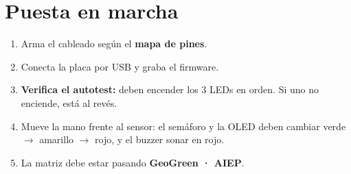 \documentclass[10pt,letterpaper]{article}
\begin{document}
\section{Puesta en marcha}
\begin{enumerate}
\item Arma el cableado según el \textbf{mapa de pines}.
\item Conecta la placa por USB y graba el firmware.
\item \textbf{Verifica el autotest:} deben encender los 3 LEDs en orden. Si uno no enciende, está
al revés.
\item Mueve la mano frente al sensor: el semáforo y la OLED deben cambiar
verde $\rightarrow$ amarillo $\rightarrow$ rojo, y el buzzer sonar en rojo.
\item La matriz debe estar pasando \textbf{GeoGreen · AIEP}.
\end{enumerate}
\end{document}
